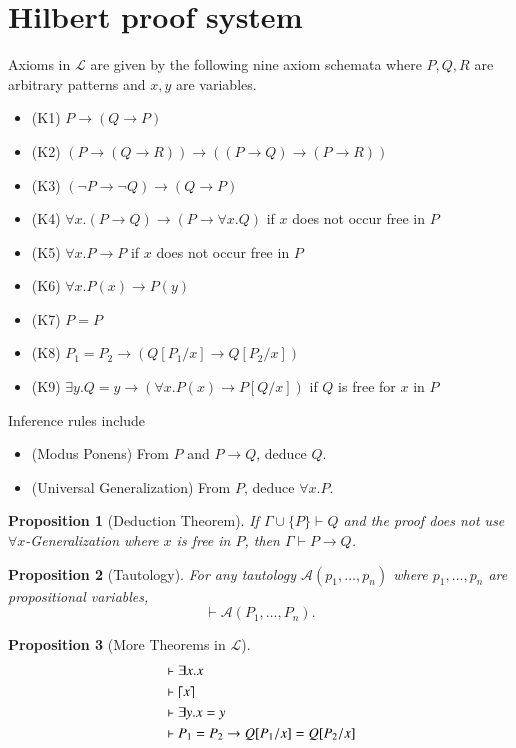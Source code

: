 \documentclass{article}
\newtheorem{prop}{Proposition}
\DeclarePairedDelimiter\ceil{\lceil}{\rceil}
\begin{document}
\section{Hilbert proof system}
Axioms in $\mathcal{L}$ are given by the following nine axiom schemata where $P, Q, R$ are arbitrary patterns and $x, y$ are variables.
\begin{itemize}
\item (K1) $P \to (Q \to P)$
\item (K2) $(P \to (Q \to R)) \to ((P \to Q) \to (P \to R))$
\item (K3) $(\neg P \to \neg Q) \to (Q \to P)$
\item (K4) $\forall x . (P \to Q) \to (P \to \forall x . Q)$ if $x$ does not occur free in $P$
\item (K5) $\forall x . P \to P$ if $x$ does not occur free in $P$
\item (K6) $\forall x . P(x) \to P(y)$
\item (K7) $P = P$
\item (K8) $P_1 = P_2 \to (Q[P_1/x] \to Q[P_2/x])$
\item (K9) $\exists y . Q = y \to (\forall x . P(x) \to P[Q/x])$ if $Q$ is free for $x$ in $P$
\end{itemize}

Inference rules include
\begin{itemize}
\item (Modus Ponens) From $P$ and $P \to Q$, deduce $Q$.
\item (Universal Generalization) From $P$, deduce $\forall x . P$. 
\end{itemize}

\begin{prop}[Deduction Theorem]
If $\Gamma \cup \{P\} \vdash Q$ and the proof does not use $\forall x$-Generalization where $x$ is free in $P$, then $\Gamma \vdash P \to Q$. 
\end{prop}

\begin{prop}[Tautology]
For any tautology $\mathcal{A}(p_1,\dots,p_n)$ where $p_1,\dots,p_n$ are propositional variables, $$ \vdash \mathcal{A}(P_1,\dots,P_n).$$
\end{prop}

\begin{prop}[More Theorems in $\mathcal{L}$]
\begin{align*}
&\vdash \exists x . x \\
&\vdash \ceil*{x} \\
&\vdash \exists y . x = y \\
&\vdash P_1 = P_2 \to Q[P_1 / x] = Q[P_2 / x]
\end{align*}
\end{prop}
\end{document}
